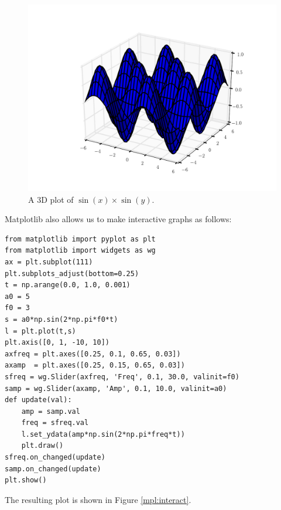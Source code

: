 \begin{figure}
\includegraphics[width=\textwidth]{3dplot.pdf}
\caption{A 3D plot of $\sin\left(x\right)\times\sin\left(y\right)$.}
\label{mpl:3dplot}
\end{figure}

Matplotlib also allows us to make interactive graphs as follows:


\begin{lstlisting}
from matplotlib import pyplot as plt
from matplotlib import widgets as wg
ax = plt.subplot(111)
plt.subplots_adjust(bottom=0.25)
t = np.arange(0.0, 1.0, 0.001)
a0 = 5
f0 = 3
s = a0*np.sin(2*np.pi*f0*t)
l = plt.plot(t,s)
plt.axis([0, 1, -10, 10])
axfreq = plt.axes([0.25, 0.1, 0.65, 0.03])
axamp  = plt.axes([0.25, 0.15, 0.65, 0.03])
sfreq = wg.Slider(axfreq, 'Freq', 0.1, 30.0, valinit=f0)
samp = wg.Slider(axamp, 'Amp', 0.1, 10.0, valinit=a0)
def update(val):
    amp = samp.val
    freq = sfreq.val
    l.set_ydata(amp*np.sin(2*np.pi*freq*t))
    plt.draw()
sfreq.on_changed(update)
samp.on_changed(update)
plt.show()
\end{lstlisting}
The resulting plot is shown in Figure \ref{mpl:interact}.

